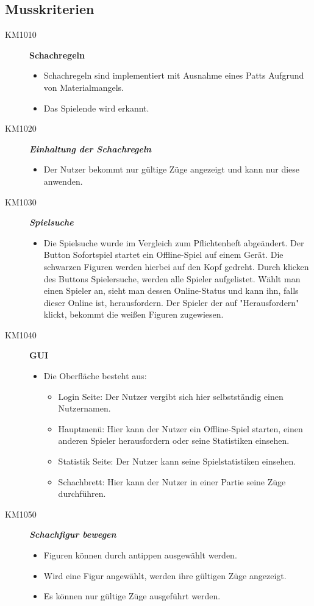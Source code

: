 \documentclass[parskip=full]{scrartcl}
\begin{document}
\subsection{Musskriterien}
\begin{description}
	\item[KM1010] \textbf{Schachregeln}
	\begin{itemize}
		\item Schachregeln sind implementiert mit Ausnahme eines Patts Aufgrund von Materialmangels.
		\item Das Spielende wird erkannt.
	\end{itemize}
	\item[KM1020] \textbf{\textit{Einhaltung der Schachregeln}}
	\begin{itemize}
		\item Der Nutzer bekommt nur gültige Züge angezeigt und kann nur diese anwenden.
	\end{itemize}
	\item[KM1030] \textbf{\textit{Spielsuche}}
	\begin{itemize}
		\item Die Spielsuche wurde im Vergleich zum Pflichtenheft abgeändert.
		Der Button Sofortspiel startet ein Offline-Spiel auf einem Gerät. Die schwarzen Figuren werden hierbei auf den Kopf gedreht.
		Durch klicken des Buttons Spielersuche, werden alle Spieler aufgelistet.
		Wählt man einen Spieler an, sieht man dessen Online-Status und kann ihn, falls dieser Online ist, herausfordern. Der Spieler der auf "Herausfordern" klickt, bekommt die weißen Figuren zugewiesen.
	\end{itemize}
	\item[KM1040] \textbf{GUI}
	\begin{itemize}
		\item Die Oberfläche besteht aus:
		\begin{itemize}		
			\item Login Seite: Der Nutzer vergibt sich hier selbstständig einen Nutzernamen.
			
			\item Hauptmenü: Hier kann der Nutzer ein Offline-Spiel starten, einen anderen Spieler herausfordern oder seine Statistiken einsehen.
			
			\item Statistik Seite: Der Nutzer kann seine Spielstatistiken einsehen.
			
			\item Schachbrett: Hier kann der Nutzer in einer Partie seine Züge durchführen.
			
		\end{itemize}
	\end{itemize}
	\item[KM1050] \textbf{\textit{Schachfigur bewegen}}
	\begin{itemize}
		\item Figuren können durch antippen ausgewählt werden.
		\item Wird eine Figur angewählt, werden ihre gültigen Züge angezeigt.
		\item Es können nur gültige Züge ausgeführt werden.
	\end{itemize}
\end{description}
\end{document}
